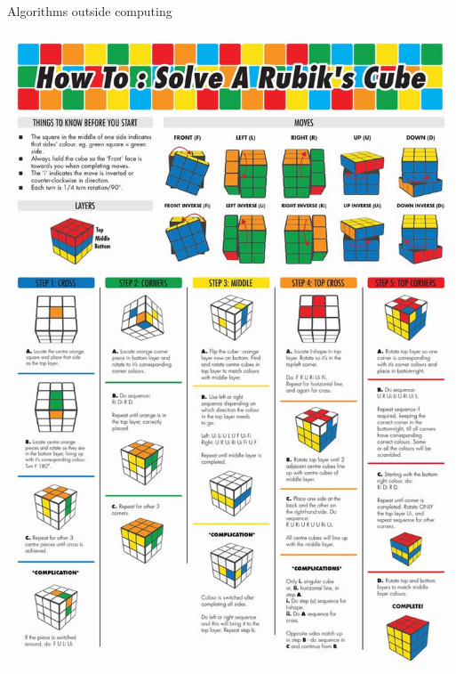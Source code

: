\begin{frame}{Algorithms outside computing}
	\begin{center}
		\includegraphics[height=0.8\textheight]{rubik_algorithm}
	\end{center}
\end{frame}
